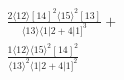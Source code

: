 \documentclass[varwidth, border=5pt]{standalone}
\begin{document}
\begin{my}
$\begin{gathered}
\scriptscriptstyle\frac{2⟨12⟩[14]^2⟨15⟩^2[13]}{⟨13⟩⟨1|2+4|1]^3}+\\
\scriptscriptstyle\frac{1⟨12⟩⟨15⟩^2[14]^2}{⟨13⟩^2⟨1|2+4|1]^2}\phantom{+}
\end{gathered}$
\end{my}
\end{document}
